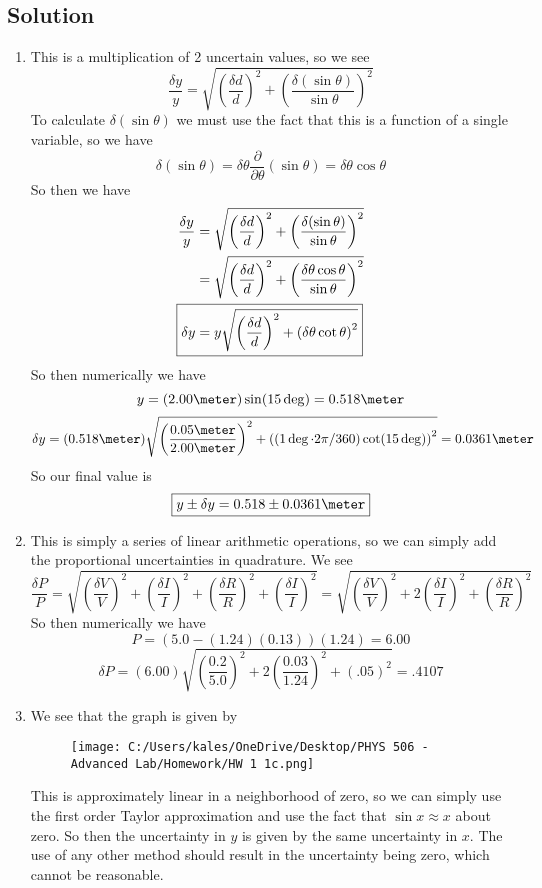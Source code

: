 \documentclass[]{article}
\newcommand{\bd}{\textbf}
\begin{document}
		\subsection*{Solution}
			\begin{enumerate}[label = \bd{(\alph*)}]
				\item This is a multiplication of 2 uncertain values, so we see
				\[
					\frac{\delta y}{y} = \sqrt{\left(\frac{\delta d}{d}\right)^2+\left(\frac{\delta (\sin \theta)}{\sin \theta}\right)^2}
				\]
				To calculate $\delta (\sin \theta)$ we must use the fact that this is a function of a single variable, so we have 
				\[
					\delta (\sin \theta) = \delta \theta \frac{\partial }{\partial \theta}(\sin \theta) = \delta \theta\cos \theta
				\]
				So then we have
				\begin{align*}
					\frac{\delta y}{y} &= \sqrt{\left(\frac{\delta d}{d}\right)^2+\left(\frac{\delta (\sin \theta)}{\sin \theta}\right)^2}\\
					 &= \sqrt{\left(\frac{\delta d}{d}\right)^2+\left(\frac{\delta \theta\cos \theta}{\sin \theta}\right)^2}\\
					\Aboxed{\delta y &= y\sqrt{\left(\frac{\delta d}{d}\right)^2+\left(\delta \theta\cot \theta\right)^2}}				\end{align*}
				So then numerically we have 
				\[
					y = (2.00 \meter)\sin (15 \deg) = 0.518 \meter
				\]
				\[
					\delta y =  (0.518 \meter)\sqrt{\left(\frac{0.05 \meter}{2.00 \meter}\right)^2+\left((1\deg \cdot 2\pi/360)
						\cot(15 \deg)\right)^2} = 0.0361 \meter 
				\]
				So our final value is 
				\[
					\boxed{y\pm \delta y = 0.518\pm 0.0361 \meter}
				\]
				\item This is simply a series of linear arithmetic operations, so we can simply add the proportional uncertainties in quadrature. We see
				\[
					\frac{\delta P}{P} = \sqrt{\left(\frac{\delta V}{V}\right)^2 + \left(\frac{\delta I}{I}\right)^2 + \left(\frac{\delta R}{R}\right)^2+ \left(\frac{\delta I}{I}\right)^2} =\sqrt{\left(\frac{\delta V}{V}\right)^2 + 2\left(\frac{\delta I}{I}\right)^2 + \left(\frac{\delta R}{R}\right)^2}
				\]
				So then numerically we have 
				\[
					P = (5.0 - (1.24)(0.13))(1.24)= \boxed{6.00} 
				\]
				\[
					\delta P = (6.00)\sqrt{\left(\frac{0.2}{5.0}\right)^2 + 2\left(\frac{0.03}{1.24}\right)^2 + \left(.05\right)^2} = \boxed{.4107}
				\]
				\item We see that the graph is given by
				\begin{figure}
					\centering
					\texttt{[image: C:/Users/kales/OneDrive/Desktop/PHYS 506 - Advanced Lab/Homework/HW 1 1c.png]}
				\end{figure}
				This is approximately linear in a neighborhood of zero, so we can simply use the first order Taylor approximation and use the fact that $\sin x\approx x$ about zero. So then the uncertainty in $y$ is given by the same uncertainty in $x$. The use of any other method should result in the uncertainty being zero, which cannot be reasonable.
			\end{enumerate}
\end{document}
